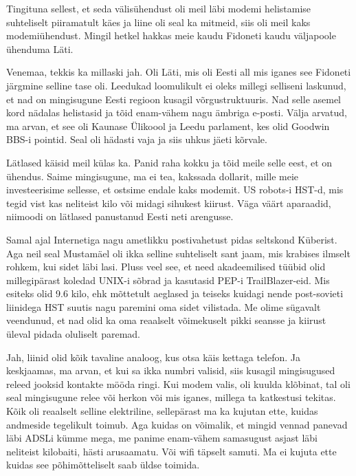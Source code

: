 Tingituna sellest, et seda välisühendust oli meil läbi modemi helistamise  
suhteliselt piiramatult käes ja liine oli seal ka mitmeid, siis oli meil  kaks 
modemiühendust. Mingil hetkel hakkas meie kaudu Fidoneti kaudu väljapoole 
ühenduma Läti.


Venemaa, tekkis ka millaski jah. Oli Läti, mis oli Eesti all  mis iganes see 
Fidoneti järgmine selline tase oli. Leedukad loomulikult ei oleks millegi 
selliseni laskunud, et nad on mingisugune Eesti regioon kusagil 
võrgustruktuuris. Nad selle asemel kord nädalas helistasid ja tõid enam-vähem 
nagu ämbriga e-posti. Välja arvatud, ma arvan, et see oli Kaunase 
Ülikoool ja Leedu parlament, kes olid 
Goodwin BBS-i pointid. Seal oli hädasti vaja ja siis uhkus jäeti kõrvale. 

Lätlased käisid meil külas ka. Panid raha kokku ja tõid meile selle eest, et on 
ühendus. Saime mingisugune, ma ei tea, kakssada dollarit, mille meie 
investeerisime sellesse, et  ostsime endale kaks modemit. US robots-i  HST-d, mis tegid vist kas neliteist kilo või midagi sihukest 
kiirust. Väga väärt aparaadid, niimoodi on lätlased panustanud  Eesti neti  
arengusse.

Samal ajal Internetiga nagu ametlikku postivahetust pidas seltskond 
Küberist. Aga neil seal Mustamäel oli ikka 
selline suhteliselt sant jaam,  mis  krabises ilmselt rohkem, kui sidet läbi 
lasi. Pluss veel see, et need akadeemilised tüübid olid millegipärast koledad 
UNIX-i sõbrad ja kasutasid PEP-i TrailBlazer-eid. 
Mis esiteks olid 9.6 kilo, ehk mõttetult aeglased ja teiseks kuidagi nende 
post-sovieti liinidega HST suutis nagu paremini oma sidet vilistada. Me olime 
sügavalt veendunud, et nad olid ka oma reaalselt võimekuselt pikki seansse ja 
kiirust üleval pidada  oluliselt paremad. 


Jah, liinid olid kõik tavaline analoog, kus otsa käis kettaga telefon. Ja 
keskjaamas, ma arvan, et kui sa ikka numbri valisid, siis kusagil  mingisugused 
 releed jooksid kontakte mööda ringi. Kui modem valis, oli kuulda  klõbinat, 
tal oli seal mingisugune relee või herkon või mis iganes, millega ta katkestusi 
tekitas. Kõik oli reaalselt selline elektriline, sellepärast ma ka kujutan 
ette, kuidas andmeside  tegelikult toimub. Aga  kuidas on võimalik, et mingid 
vennad panevad läbi ADSLi kümme mega, me panime enam-vähem samasugust asjast 
läbi neliteist kilobaiti, hästi arusaamatu. Või wifi täpselt samuti. Ma ei 
kujuta ette kuidas see põhimõtteliselt saab üldse toimida. 

